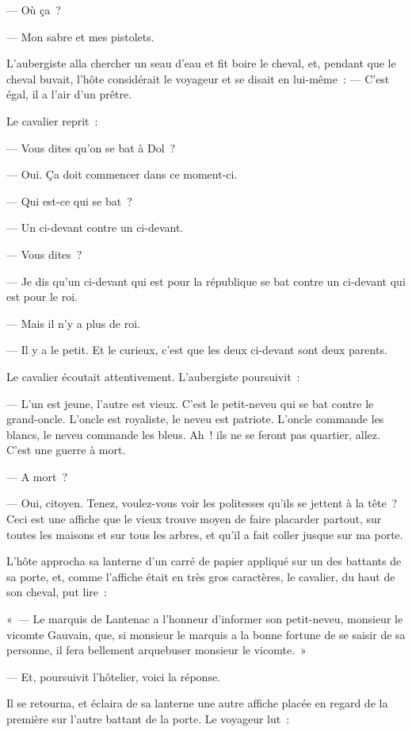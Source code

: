 \documentclass[french,twoside]{book} %
\begin{document}
— Où ça ?\par
— Mon sabre et mes pistolets.\par
L’aubergiste alla chercher un seau d’eau et fit boire le cheval, et, pendant que le cheval buvait, l’hôte considérait le voyageur et se disait en lui-même : — C’est égal, il a l’air d’un prêtre.\par
Le cavalier reprit :\par
— Vous dites qu’on se bat à Dol ?\par
— Oui. Ça doit commencer dans ce moment-ci.\par
— Qui est-ce qui se bat ?\par
— Un ci-devant contre un ci-devant.\par
— Vous dites ?\par
— Je dis qu’un ci-devant qui est pour la république se bat contre un ci-devant qui est pour le roi.\par
— Mais il n’y a plus de roi.\par
— Il y a le petit. Et le curieux, c’est que les deux ci-devant sont deux parents.\par
Le cavalier écoutait attentivement. L’aubergiste poursuivit :\par
— L’un est jeune, l’autre est vieux. C’est le petit-neveu qui se bat contre le grand-oncle. L’oncle est royaliste, le neveu est patriote. L’oncle commande les blancs, le neveu commande les bleus. Ah ! ils ne se  feront pas quartier, allez. C’est une guerre à mort.\par
— A mort ?\par
— Oui, citoyen. Tenez, voulez-vous voir les politesses qu’ils se jettent à la tête ? Ceci est une affiche que le vieux trouve moyen de faire placarder partout, sur toutes les maisons et sur tous les arbres, et qu’il a fait coller jusque sur ma porte.\par
L’hôte approcha sa lanterne d’un carré de papier appliqué sur un des battants de sa porte, et, comme l’affiche était en très gros caractères, le cavalier, du haut de son cheval, put lire :\par
« — Le marquis de Lantenac a l’honneur d’informer son petit-neveu, monsieur le vicomte Gauvain, que, si monsieur le marquis a la bonne fortune de se saisir de sa personne, il fera bellement arquebuser monsieur le vicomte. »\par
— Et, poursuivit l’hôtelier, voici la réponse.\par
Il se retourna, et éclaira de sa lanterne une autre affiche placée en regard de la première sur l’autre battant de la porte. Le voyageur lut :\par
\end{document}
